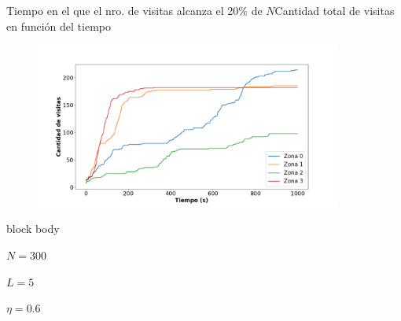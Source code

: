 \documentclass{beamer}
\begin{document}
            \begin{frame}{Tiempo en el que el nro. de visitas alcanza el 20\% de $N$}{Cantidad total de visitas en función del tiempo}
                \begin{figure}[H!]
                    \includegraphics[width=0.9\textwidth]{./visits_vs_time_pbc-n300-eta0p6}
                    \label{fig:pbc_2}
                \end{figure}
                \begin{beamercolorbox}[sep=5pt,center]{block body}
                    \begin{minipage}[t]{0.3\textwidth}
                        \centering
                        \small{$N=300$}
                    \end{minipage}
                    \hfill
                    \begin{minipage}[t]{0.3\textwidth}
                        \centering
                        \small{$L=5$}
                    \end{minipage}
                    \hfill
                    \begin{minipage}[t]{0.3\textwidth}
                        \centering
                        \small{$\eta=0.6$}
                    \end{minipage}
                \end{beamercolorbox}
            \end{frame}
\end{document}
